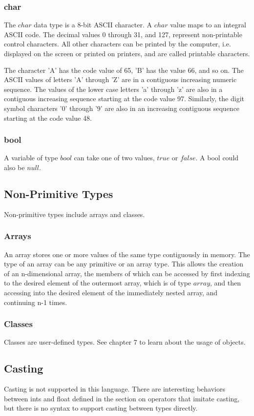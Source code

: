 \begin{homeworkProblem}
	\subsubsection{char}

	The $char$ data type is a 8-bit ASCII character. A $char$ value maps to an integral ASCII code. The decimal values 0 through 31, and 127, represent non-printable control characters. All other characters can be printed by the computer, i.e. displayed on the screen or printed on printers, and are called printable characters.

    The character 'A' has the code value of 65, 'B' has the value 66, and so on. The ASCII values of letters 'A' through 'Z' are in a contiguous increasing numeric sequence. The values of the lower case letters 'a' through 'z' are also in a contiguous increasing sequence starting at the code value 97. Similarly, the digit symbol characters '0' through '9' are also in an increasing contiguous sequence starting at the code value 48.

	\subsubsection{bool}

	A variable of type $bool$ can take one of two values, $true$ or $false$. A bool could also be $null$.\\

	\subsection{Non-Primitive Types}
    Non-primitive types include arrays and classes.
	\subsubsection{Arrays}
	An array stores one or more values of the same type contiguously in memory. The type of an array can be any primitive or an array type. This allows the creation of an n-dimensional array, the members of which can be accessed by first indexing to the desired element of the outermost array, which is of type $array$, and then accessing into the desired element of the immediately nested array, and continuing n-1 times.

	\subsubsection{Classes}
	
	Classes are user-defined types. See chapter 7 to learn about the usage of objects.

	\subsection{Casting}
	Casting is not supported in this language. There are interesting behaviors between ints and float defined in the section on operators that imitate casting, but there is no syntax to support casting between types directly. 

\end{homeworkProblem}
